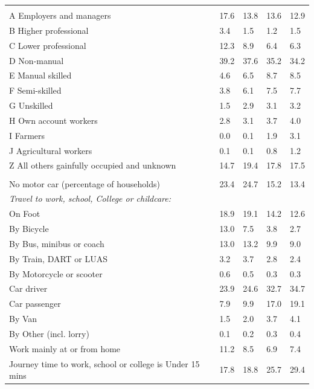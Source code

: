 \documentclass{article}
\begin{document}
\begin{table}[h]
\begin{tabular}{KTTTT}
\hline
    \\ 
    \hline
A Employers and managers & 17.6& 13.8& 13.6& 12.9\\
B Higher professional & 3.4& 1.5& 1.2& 1.5\\
C Lower professional & 12.3&  8.9&  6.4&  6.3\\
D Non-manual & 39.2& 37.6& 35.2& 34.2\\
E Manual skilled & 4.6& 6.5& 8.7& 8.5\\
F Semi-skilled & 3.8& 6.1& 7.5& 7.7\\
G Unskilled & 1.5& 2.9& 3.1& 3.2\\
H Own account workers & 2.8& 3.1& 3.7& 4.0\\
I Farmers & 0.0& 0.1& 1.9& 3.1\\
J Agricultural workers & 0.1& 0.1& 0.8& 1.2\\
Z All others gainfully occupied and unknown & 14.7& 19.4& 17.8& 17.5\\
\hline
{}\hline
    \\ 
    \hline
No motor car (percentage of households) & 23.4& 24.7& 15.2& 
13.4\\
    \hline 
\emph{Travel to work, school, College or childcare:} & & & \\
\quad On Foot & 18.9& 19.1& 14.2& 12.6\\ 
\quad By Bicycle & 13.0&  7.5&  3.8&  2.7\\ 
\quad By Bus, minibus or coach & 13.0& 13.2&  9.9&  9.0\\
\quad By Train, DART or LUAS & 3.2& 3.7& 2.8& 2.4\\
\quad By Motorcycle or scooter & 0.6& 0.5& 0.3& 0.3\\
\quad Car driver & 23.9 & 24.6& 32.7& 34.7\\
\quad Car passenger &  7.9&  9.9& 17.0& 19.1\\
\quad By Van & 1.5& 2.0& 3.7& 4.1\\
\quad By Other (incl. lorry) & 0.1& 0.2& 0.3& 0.4\\
    \hline
Work mainly at or from home & 11.2&  8.5&  6.9&  7.4\\
Journey time to work, school or college is Under 15 mins & 17.8& 18.8& 25.7& 29.4\\

\end{tabular}
\end{table}
\end{document}
